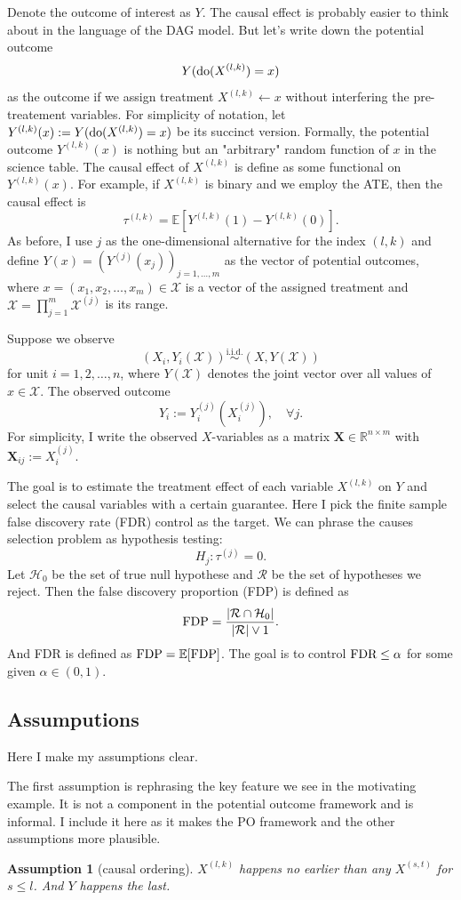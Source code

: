 \documentclass[11pt]{article}
\newtheorem{assume}[thm]{Assumption}
\newcommand{\cH}{\mathcal{H}}
\newcommand{\cR}{\mathcal{R}}
\newcommand{\cX}{\mathcal{X}}
\newcommand{\RR}{\mathbb{R}}
\newcommand{\EE}{\mathbb{E}}
\newcommand{\FDR}{\textnormal{FDR}}
\newcommand{\FDP}{\textnormal{FDP}}
\newcommand{\Do}{{\textnormal{do}}}
\newcommand{\simiid}{\overset{\text{i.i.d.}}{\sim}}
\newcommand{\pth}[1]{\left( #1 \right)}
\newcommand{\br}[1]{\left[ #1 \right]}
\newcommand{\mat}[1]{\boldsymbol{#1}}
\newcommand{\mam}{\vee}
\begin{document}
Denote the outcome of interest as $Y$. The causal effect is probably easier to think about in the language of the DAG model. But let's write down the potential outcome
\[ Y(\Do(X^{(l,k)}) = x) \]
as the outcome if we assign treatment $X^{(l,k)} \leftarrow x$ without interfering the pre-treatement variables. For simplicity of notation, let $Y^{(l,k)}(x) := Y(\Do(X^{(l,k)}) = x)$ be its succinct version. Formally, the potential outcome $Y^{(l,k)}(x)$ is nothing but an "arbitrary" random function of $x$ in the science table. The causal effect of $X^{(l,k)}$ is define as some functional on $Y^{(l,k)}(x)$. For example, if $X^{(l,k)}$ is binary and we employ the ATE, then the causal effect is
\[ \tau^{(l,k)} =  \EE \br{Y^{(l,k)}(1) - Y^{(l,k)}(0)}. \]
As before, I use $j$ as the one-dimensional alternative for the index $(l,k)$ and define $Y(x) = \pth{Y^{(j)}(x_j)}_{j = 1, \ldots, m}$ as the vector of potential outcomes, where $x = (x_1, x_2, \ldots, x_m) \in \cX$ is a vector of the assigned treatment and $\cX = \prod_{j=1}^m \cX^{(j)}$ is its range.

Suppose we observe
\[ (X_i, Y_i(\cX)) \simiid (X, Y(\cX)) \]
for unit $i = 1, 2, \ldots, n$, where $Y(\cX)$ denotes the joint vector over all values of $x \in \cX$. The observed outcome
\[ Y_i := Y_i^{(j)}(X_i^{(j)}), \quad \forall j. \]
For simplicity, I write the observed $X$-variables as a matrix $\mat X \in \RR^{n \times m}$ with $\mat X_{ij} := X_i^{(j)}$.

The goal is to estimate the treatment effect of each variable $X^{(l,k)}$ on $Y$ and select the causal variables with a certain guarantee. Here I pick the finite sample false discovery rate (FDR) \citep{benjamini1995controlling} control as the target. We can phrase the causes selection problem as hypothesis testing:
\[ H_j: \tau^{(j)} = 0. \]
Let $\cH_0$ be the set of true null hypothese and $\cR$ be the set of hypotheses we reject. Then the false discovery proportion (FDP) is defined as
\[ \FDP = \frac{|\cR \cap \cH_0|}{|\cR| \mam 1}. \]
And FDR is defined as $\FDP = \EE[\FDP]$. The goal is to control $\FDR \leq \alpha$ for some given $\alpha \in (0,1)$.

\subsection{Assumputions}%
\label{sub:assumputions}

Here I make my assumptions clear.

The first assumption is rephrasing the key feature we see in the motivating example. It is not a component in the potential outcome framework and is informal. I include it here as it makes the PO framework and the other assumptions more plausible.
\begin{assume}[causal ordering]
    $X^{(l,k)}$ happens no earlier than any $X^{(s,t)}$ for $s \leq l$. And $Y$ happens the last.
\end{assume}
\end{document}

